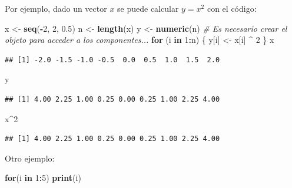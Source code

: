 \documentclass[]{book}
\newenvironment{Shaded}{\begin{snugshade}}{\end{snugshade}}
\newcommand{\KeywordTok}[1]{\textcolor[rgb]{0.13,0.29,0.53}{\textbf{#1}}}
\newcommand{\DecValTok}[1]{\textcolor[rgb]{0.00,0.00,0.81}{#1}}
\newcommand{\FloatTok}[1]{\textcolor[rgb]{0.00,0.00,0.81}{#1}}
\newcommand{\StringTok}[1]{\textcolor[rgb]{0.31,0.60,0.02}{#1}}
\newcommand{\CommentTok}[1]{\textcolor[rgb]{0.56,0.35,0.01}{\textit{#1}}}
\newcommand{\ControlFlowTok}[1]{\textcolor[rgb]{0.13,0.29,0.53}{\textbf{#1}}}
\newcommand{\OperatorTok}[1]{\textcolor[rgb]{0.81,0.36,0.00}{\textbf{#1}}}
\newcommand{\NormalTok}[1]{#1}
\begin{document}
Por ejemplo, dado un vector \(x\) se puede calcular \(y=x^2\) con el
código:

\begin{Shaded}
\begin{Highlighting}[]
\NormalTok{x <-}\StringTok{ }\KeywordTok{seq}\NormalTok{(}\OperatorTok{-}\DecValTok{2}\NormalTok{, }\DecValTok{2}\NormalTok{, }\FloatTok{0.5}\NormalTok{)}
\NormalTok{n <-}\StringTok{ }\KeywordTok{length}\NormalTok{(x)}
\NormalTok{y <-}\StringTok{ }\KeywordTok{numeric}\NormalTok{(n) }\CommentTok{# Es necesario crear el objeto para acceder a los componentes...}
\ControlFlowTok{for}\NormalTok{ (i }\ControlFlowTok{in} \DecValTok{1}\OperatorTok{:}\NormalTok{n) \{ y[i] <-}\StringTok{ }\NormalTok{x[i] }\OperatorTok{^}\StringTok{ }\DecValTok{2}\NormalTok{ \}}
\NormalTok{x}
\end{Highlighting}
\end{Shaded}

\begin{verbatim}
## [1] -2.0 -1.5 -1.0 -0.5  0.0  0.5  1.0  1.5  2.0
\end{verbatim}

\begin{Shaded}
\begin{Highlighting}[]
\NormalTok{y}
\end{Highlighting}
\end{Shaded}

\begin{verbatim}
## [1] 4.00 2.25 1.00 0.25 0.00 0.25 1.00 2.25 4.00
\end{verbatim}

\begin{Shaded}
\begin{Highlighting}[]
\NormalTok{x}\OperatorTok{^}\DecValTok{2}
\end{Highlighting}
\end{Shaded}

\begin{verbatim}
## [1] 4.00 2.25 1.00 0.25 0.00 0.25 1.00 2.25 4.00
\end{verbatim}

Otro ejemplo:

\begin{Shaded}
\begin{Highlighting}[]
\ControlFlowTok{for}\NormalTok{(i }\ControlFlowTok{in} \DecValTok{1}\OperatorTok{:}\DecValTok{5}\NormalTok{) }\KeywordTok{print}\NormalTok{(i)}
\end{Highlighting}
\end{Shaded}
\end{document}
